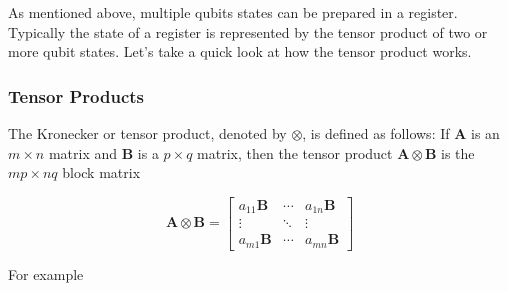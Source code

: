 \documentclass{article}
\theoremstyle{definition}
\begin{document}
\noindent
As mentioned above, multiple qubits states can be prepared in a
register. Typically the state of a register is represented by the
tensor product \cite{wiki:kronecker} of two or more qubit
states. Let's take a quick look at how the tensor product works.


\subsubsection{Tensor Products}

The Kronecker or tensor product, denoted by $\otimes$, is defined
as follows: If $\mathbf{A}$ is an $m \times n$ matrix and
$\mathbf{B}$ is a $p \times q$ matrix, then the tensor product
$\mathbf{A} \otimes \mathbf{B}$ is the $mp \times nq$ block
matrix

\bigskip
\begin{equation*}
\mathbf {A} \otimes \mathbf {B} =
\begin{bmatrix}a_{11}\mathbf {B} &\cdots &a_{1n}\mathbf {B} \\\vdots &\ddots &\vdots \\a_{m1}\mathbf {B} &\cdots &a_{mn}\mathbf {B} 
\end{bmatrix}
\end{equation*}

\bigskip
\noindent
For example \cite{wiki:kronecker}
\end{document}
